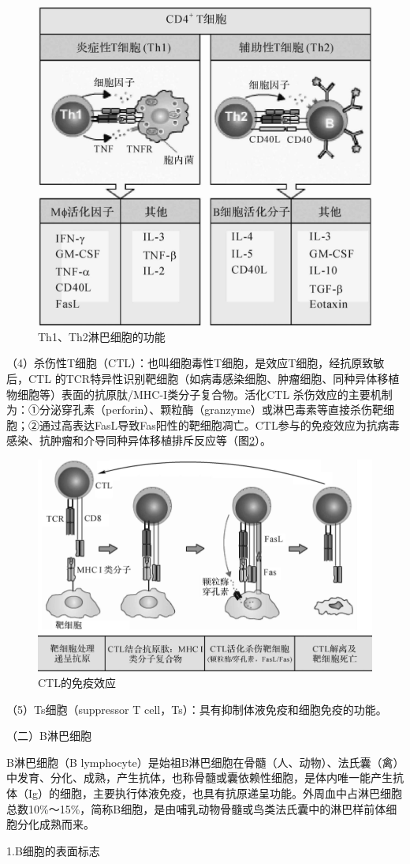 \begin{figure}[!htbp]
 \centering
 \includegraphics[width=.5\textwidth]{./images/Image00041.jpg}
 \caption{Th1、Th2淋巴细胞的功能}
 \label{fig2-16}
  \end{figure} 

（4）杀伤性T细胞（CTL）：也叫细胞毒性T细胞，是效应T细胞，经抗原致敏后，CTL
的TCR特异性识别靶细胞（如病毒感染细胞、肿瘤细胞、同种异体移植物细胞等）表面的抗原肽/MHC-I类分子复合物。活化CTL
杀伤效应的主要机制为：①分泌穿孔素（perforin）、颗粒酶（granzyme）或淋巴毒素等直接杀伤靶细胞；②通过高表达FasL导致Fas阳性的靶细胞凋亡。CTL参与的免疫效应为抗病毒感染、抗肿瘤和介导同种异体移植排斥反应等（图\ref{fig2-17}）。

\begin{figure}[!htbp]
 \centering
 \includegraphics[width=.5\textwidth]{./images/Image00042.jpg}
 \caption{CTL的免疫效应}
 \label{fig2-17}
  \end{figure} 

（5）Ts细胞（suppressor T cell，Ts）：具有抑制体液免疫和细胞免疫的功能。

（二）B淋巴细胞

B淋巴细胞（B
lymphocyte）是始祖B淋巴细胞在骨髓（人、动物）、法氏囊（禽）中发育、分化、成熟，产生抗体，也称骨髓或囊依赖性细胞，是体内唯一能产生抗体（Ig）的细胞，主要执行体液免疫，也具有抗原递呈功能。外周血中占淋巴细胞总数10\%～15\%，简称B细胞，是由哺乳动物骨髓或鸟类法氏囊中的淋巴样前体细胞分化成熟而来。

1.B细胞的表面标志

